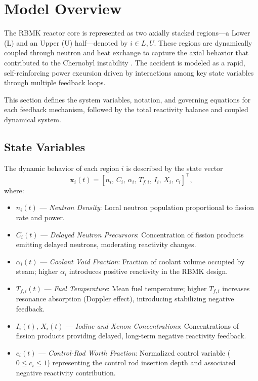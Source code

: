\documentclass[11pt]{article}
\begin{document}
\section{Model Overview}\label{sec:model}
The RBMK reactor core is represented as two axially stacked regions—a Lower (L) and an Upper (U) half—denoted by $i \in {L, U}$. These regions are dynamically coupled through neutron and heat exchange to capture the axial behavior that contributed to the Chernobyl instability \cite{INSAG7,WNA_RBMK}. The accident is modeled as a rapid, self-reinforcing power excursion driven by interactions among key state variables through multiple feedback loops.

This section defines the system variables, notation, and governing equations for each feedback mechanism, followed by the total reactivity balance and coupled dynamical system.

\subsection{State Variables}
The dynamic behavior of each region $i$ is described by the state vector
\[
\mathbf{x}_i(t) = [n_i,\, C_i,\, \alpha_i,\, T_{f,i},\, I_i,\, X_i,\, c_i]^{\!\top},
\]
where:

\begin{itemize}
    \item \textbf{$n_i(t)$} — \textit{Neutron Density}: Local neutron population proportional to fission rate and power.
    \item \textbf{$C_i(t)$} — \textit{Delayed Neutron Precursors}: Concentration of fission products emitting delayed neutrons, moderating reactivity changes.
    \item \textbf{$\alpha_i(t)$} — \textit{Coolant Void Fraction}: Fraction of coolant volume occupied by steam; higher $\alpha_i$ introduces positive reactivity in the RBMK design.
    \item \textbf{$T_{f,i}(t)$} — \textit{Fuel Temperature}: Mean fuel temperature; higher $T_{f,i}$ increases resonance absorption (Doppler effect), introducing stabilizing negative feedback.
    \item \textbf{$I_i(t)$}, \textbf{$X_i(t)$} — \textit{Iodine and Xenon Concentrations}: Concentrations of fission products providing delayed, long-term negative reactivity feedback.
    \item \textbf{$c_i(t)$} — \textit{Control-Rod Worth Fraction}: Normalized control variable ($0 \le c_i \le 1$) representing the control rod insertion depth and associated negative reactivity contribution.
\end{itemize}
\end{document}
